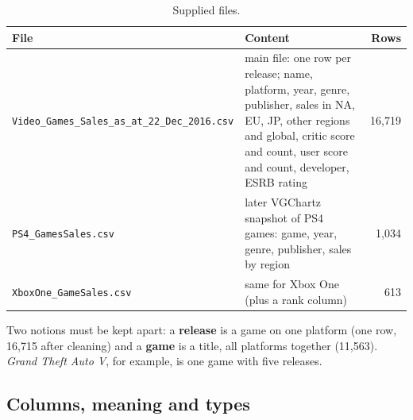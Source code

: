 \documentclass[12pt,a4paper]{article}
\begin{document}
\begin{table}[H]\centering\small
\caption{Supplied files.}
\begin{tabularx}{\linewidth}{@{}lXr@{}}
\toprule
File & Content & Rows\\\midrule
\texttt{Video\_Games\_Sales\_as\_at\_22\_Dec\_2016.csv} & main file: one row per release; name, platform, year, genre, publisher, sales in NA, EU, JP, other regions and global, critic score and count, user score and count, developer, ESRB rating & 16{,}719\\
\texttt{PS4\_GamesSales.csv} & later VGChartz snapshot of PS4 games: game, year, genre, publisher, sales by region & 1{,}034\\
\texttt{XboxOne\_GameSales.csv} & same for Xbox One (plus a rank column) & 613\\
\bottomrule
\end{tabularx}
\end{table}

Two notions must be kept apart: a \textbf{release} is a game on one platform (one row,
16{,}715 after cleaning) and a \textbf{game} is a title, all platforms together (11{,}563).
\emph{Grand Theft Auto V}, for example, is one game with five releases.

\subsection{Columns, meaning and types}
\end{document}
